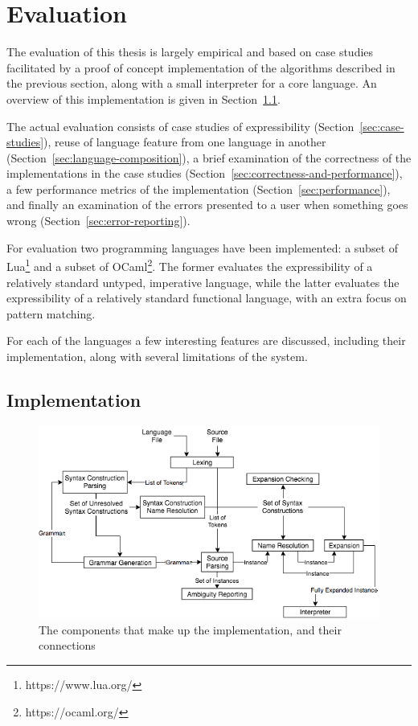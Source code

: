 \documentclass{kththesis}
\begin{document}
\chapter{Evaluation} \label{sec:evaluation}

The evaluation of this thesis is largely empirical and based on case studies facilitated by a proof of concept implementation of the algorithms described in the previous section, along with a small interpreter for a core language. An overview of this implementation is given in Section~\ref{sec:implementation}.

The actual evaluation consists of case studies of expressibility (Section~\ref{sec:case-studies}), reuse of language feature from one language in another (Section~\ref{sec:language-composition}), a brief examination of the correctness of the implementations in the case studies (Section~\ref{sec:correctness-and-performance}), a few performance metrics of the implementation (Section~\ref{sec:performance}), and finally an examination of the errors presented to a user when something goes wrong (Section~\ref{sec:error-reporting}).

For evaluation two programming languages have been implemented: a subset of Lua\footnote{https://www.lua.org/} and a subset of OCaml\footnote{https://ocaml.org/}. The former evaluates the expressibility of a relatively standard untyped, imperative language, while the latter evaluates the expressibility of  a relatively standard functional language, with an extra focus on pattern matching.

For each of the languages a few interesting features are discussed, including their implementation, along with several limitations of the system.

\section{Implementation} \label{sec:implementation}

\begin{figure}[t]
\includegraphics[width=\textwidth]{resources/implementation-flowchart}
\caption{The components that make up the implementation, and their connections}
\label{fig:implementation-flowchart}
\end{figure}
\end{document}
